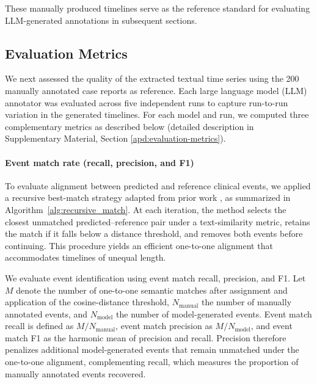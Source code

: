 \documentclass[pdflatex,sn-mathphys-num]{sn-jnl}%
\newif\ifshowrebuttalcolor
\newcommand{\rebuttal}[1]{%
  \ifshowrebuttalcolor
    \textcolor{rebuttalblue}{#1}%
  \else
    #1%
  \fi
}
\theoremstyle{thmstyleone}%
\theoremstyle{thmstyletwo}%
\theoremstyle{thmstylethree}%
\begin{document}
These manually produced timelines serve as the reference standard for evaluating LLM-generated annotations in subsequent sections.

\subsection{Evaluation Metrics}
\label{sec:evaluation-metrics}

We next assessed the quality of the extracted textual time series using the 200 manually annotated case reports as reference. Each large language model (LLM) annotator was evaluated across five independent runs to capture run-to-run variation in the generated timelines. For each model and run, we computed three complementary metrics as described below (detailed description in Supplementary Material, Section \ref{apd:evaluation-metrics}).

\paragraph{Event match rate (recall, precision, and F1)}

To evaluate alignment between predicted and reference clinical events, we applied a recursive best-match strategy adapted from prior work \citep{wang2025large, pmlr-v333-noroozizadeh26a}, as summarized in Algorithm~\ref{alg:recursive_match}. At each iteration, the method selects the closest unmatched predicted--reference pair under a text-similarity metric, retains the match if it falls below a distance threshold, and removes both events before continuing. This procedure yields an efficient one-to-one alignment that accommodates timelines of unequal length.

\rebuttal{
We evaluate event identification using event match recall, precision, and F1. Let $M$ denote the number of one-to-one semantic matches after assignment and application of the cosine-distance threshold, $N_{\mathrm{manual}}$ the number of manually annotated events, and $N_{\mathrm{model}}$ the number of model-generated events. Event match recall is defined as $M/N_{\mathrm{manual}}$, event match precision as $M/N_{\mathrm{model}}$, and event match F1 as the harmonic mean of precision and recall. Precision therefore penalizes additional model-generated events that remain unmatched under the one-to-one alignment, complementing recall, which measures the proportion of manually annotated events recovered.
}
\end{document}
